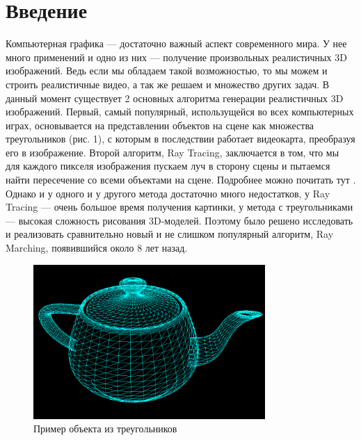 \documentclass[14pt]{matmex-diploma}
\begin{document}
\maketitle
\tableofcontents
\section*{Введение}
Компьютерная графика --- достаточно важный аспект современного мира. У нее много применений \cite{wiki:cg} 
и одно из них --- получение произвольных реалистичных 3D изображений. Ведь если мы обладаем такой возможностью, 
то мы можем и строить реалистичные видео, а так же решаем и множество других задач. 
В данный момент существует 2 основных алгоритма генерации реалистичных 3D изображений. Первый, самый популярный,
использущейся во всех компьютерных играх, основывается на представлении объектов на сцене как множества 
треугольников (рис. 1), с которым в последствии работает видеокарта, преобразуя его в изображение.
Второй алгоритм, Ray Tracing, заключается в том, что мы для каждого пикселя изображения пускаем луч в сторону сцены 
и пытаемся найти пересечение со всеми объектами на сцене. Подробнее можно почитать тут \cite{wiki:rt}.
Однако и у одного и у другого метода достаточно много недостатков, у Ray Tracing --- очень большое время получения картинки,
у метода с треугольниками --- высокая сложность рисования 3D-моделей. Поэтому было решено исследовать и реализовать сравнительно 
новый и не слишком популярный алгоритм, Ray Marching, появившийся около 8 лет назад.

\begin{figure}[t]
\label{triangle_teapot}
\centering
\includegraphics[width = 250pt]{teapot.png}
\caption{Пример объекта из треугольников}
\end{figure}
\end{document}
